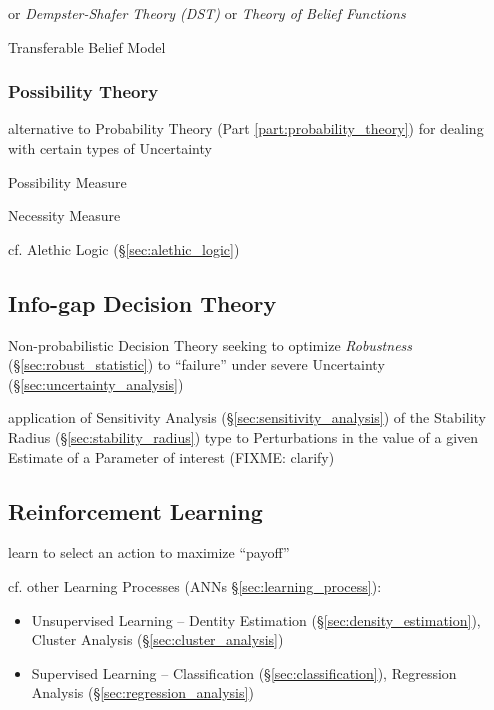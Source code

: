 or \emph{Dempster-Shafer Theory (DST)} or \emph{Theory of Belief Functions}

Transferable Belief Model



\subsubsection{Possibility Theory}\label{sec:possibility_theory}

alternative to Probability Theory (Part \ref{part:probability_theory}) for
dealing with certain types of Uncertainty

Possibility Measure

Necessity Measure

cf. Alethic Logic (\S\ref{sec:alethic_logic})



\subsection{Info-gap Decision Theory}\label{sec:info_gap}

Non-probabilistic Decision Theory seeking to optimize \emph{Robustness}
(\S\ref{sec:robust_statistic}) to ``failure'' under severe Uncertainty
(\S\ref{sec:uncertainty_analysis})

application of Sensitivity Analysis (\S\ref{sec:sensitivity_analysis}) of the
Stability Radius (\S\ref{sec:stability_radius}) type to Perturbations in the
value of a given Estimate of a Parameter of interest (FIXME: clarify)



\subsection{Reinforcement Learning}\label{sec:reinforcement_learning}

learn to select an action to maximize ``payoff''

cf. other Learning Processes (ANNs \S\ref{sec:learning_process}):
\begin{itemize}
  \item Unsupervised Learning -- Dentity Estimation
    (\S\ref{sec:density_estimation}), Cluster Analysis
    (\S\ref{sec:cluster_analysis})
  \item Supervised Learning -- Classification (\S\ref{sec:classification}),
    Regression Analysis (\S\ref{sec:regression_analysis})
\end{itemize}



